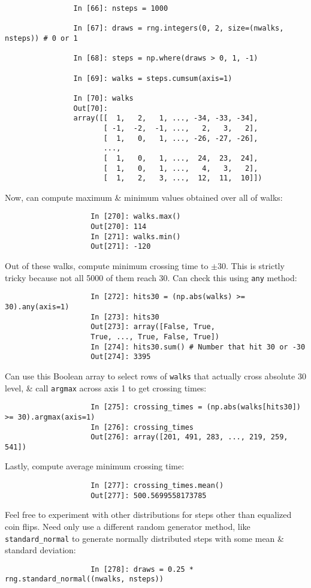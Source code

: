 \documentclass{article}
\begin{document}
\begin{enumerate}
\begin{itemize}
\begin{itemize}
\begin{itemize}
\begin{verbatim}
				In [66]: nsteps = 1000
				
				In [67]: draws = rng.integers(0, 2, size=(nwalks, nsteps)) # 0 or 1
				
				In [68]: steps = np.where(draws > 0, 1, -1)
				
				In [69]: walks = steps.cumsum(axis=1)
				
				In [70]: walks
				Out[70]: 
				array([[  1,   2,   1, ..., -34, -33, -34],
				       [ -1,  -2,  -1, ...,   2,   3,   2],
				       [  1,   0,   1, ..., -26, -27, -26],
				       ...,
				       [  1,   0,   1, ...,  24,  23,  24],
				       [  1,   0,   1, ...,   4,   3,   2],
				       [  1,   2,   3, ...,  12,  11,  10]])	
				\end{verbatim}
				Now, can compute maximum \& minimum values obtained over all of walks:
				\begin{verbatim}
					In [270]: walks.max()
					Out[270]: 114
					In [271]: walks.min()
					Out[271]: -120
				\end{verbatim}
				Out of these walks, compute minimum crossing time to $\pm30$. This is strictly tricky because not all 5000 of them reach 30. Can check this using {\tt any} method:
				\begin{verbatim}
					In [272]: hits30 = (np.abs(walks) >= 30).any(axis=1)
					In [273]: hits30
					Out[273]: array([False, True,
					True, ..., True, False, True])
					In [274]: hits30.sum() # Number that hit 30 or -30
					Out[274]: 3395
				\end{verbatim}
				Can use this Boolean array to select rows of {\tt walks} that actually cross absolute 30 level, \& call {\tt argmax} across axis 1 to get crossing times:
				\begin{verbatim}
					In [275]: crossing_times = (np.abs(walks[hits30]) >= 30).argmax(axis=1)
					In [276]: crossing_times
					Out[276]: array([201, 491, 283, ..., 219, 259, 541])
				\end{verbatim}
				Lastly, compute average minimum crossing time:
				\begin{verbatim}
					In [277]: crossing_times.mean()
					Out[277]: 500.5699558173785
				\end{verbatim}
				Feel free to experiment with other distributions for steps other than equalized coin flips. Need only use a different random generator method, like \verb|standard_normal| to generate normally distributed steps with some mean \& standard deviation:
				\begin{verbatim}
					In [278]: draws = 0.25 * rng.standard_normal((nwalks, nsteps))
				\end{verbatim}
				

\end{itemize}
\end{itemize}
\end{itemize}
\end{enumerate}
\end{document}
